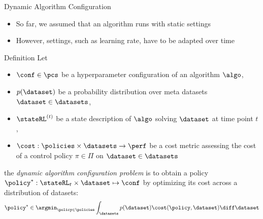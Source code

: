 \begin{frame}[c]{Dynamic Algorithm Configuration}

\begin{itemize}
	\item So far, we assumed that an algorithm runs with static settings
	\item However, settings, such as learning rate, have to be adapted over time
\end{itemize}

\begin{block}{Definition}
	Let 
	\begin{itemize}
		\item $\conf \in \pcs$ be a hyperparameter configuration of an algorithm $\algo$,
		\pause
		\item $p(\dataset)$ be a probability distribution over meta datasets $\dataset \in \datasets$,
		\pause
		\item $\stateRL^{(t)}$ be a state description of $\algo$ solving $\dataset$ at time point $t$,
		\pause
		\item $\cost: \policies \times \datasets \to \perf$ be a cost metric assessing the cost of a control policy $\pi \in \Pi$ on $\dataset \in \datasets$
	\end{itemize}
	
	\pause
	the \emph{dynamic algorithm configuration problem} is to obtain a policy $\policy^* : \stateRL_t \times \dataset \mapsto \conf$ by optimizing its cost across a distribution of datasets:
	\begin{equation}
	\policy^* \in \argmin_{\policy \in \policies} \int_{\datasets} p(\dataset) \cost(\policy, \dataset) \diff \dataset \nonumber
	\end{equation}
\end{block}

\end{frame}

